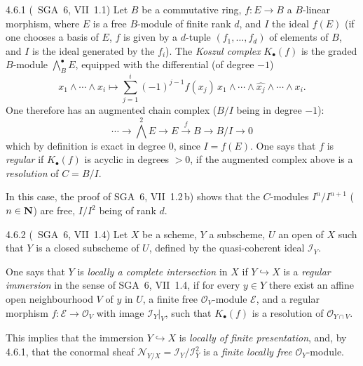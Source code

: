 \begin{definition}{4.6.1}
\label{III.4.6.1}
(\cf\ SGA~6, VII~1.1)
Let \(B\) be a commutative ring, \(f\colon E\to B\) a \(B\)-linear morphism, where \(E\) is a free \(B\)-module of finite rank \(d\), and \(I\) the ideal \(f(E)\) (if one chooses a basis of \(E\), \(f\) is given by a \(d\)-tuple \((f_{1},\ldots,f_{d})\) of elements of \(B\), and \(I\) is the ideal generated by the \(f_{i}\)). The \emph{Koszul complex} \(K_{\bullet}(f)\) is the graded \(B\)-module \(\bigwedge^{\bullet}_{B}E\), equipped with the differential (of degree \(-1\))
\[
x_{1}\wedge\cdots\wedge x_{i}
\longmapsto
\sum_{j=1}^{i}(-1)^{j-1}f(x_{j})\,x_{1}\wedge\cdots\wedge\widehat{x_{j}}\wedge\cdots\wedge x_{i}.
\]
One therefore has an augmented chain complex (\(B/I\) being in degree \(-1\)):
\[
\cdots\longrightarrow\bigwedge^{2}E\longrightarrow E\xrightarrow{f}B\longrightarrow B/I\longrightarrow 0
\]
which by definition is exact in degree \(0\), since \(I=f(E)\). One says that \(f\) is \emph{regular} if \(K_{\bullet}(f)\) is acyclic in degrees \(>0\), \ie if the augmented complex above is a \emph{resolution} of \(C=B/I\).

In this case, the proof of SGA~6, VII~1.2\,b) shows that the \(C\)-modules \(I^{n}/I^{n+1}\) (\(n\in\mathbf{N}\)) are free, \(I/I^{2}\) being of rank \(d\).
\end{definition}

\begin{definition}{4.6.2}
\label{III.4.6.2}
(\cf\ SGA~6, VII~1.4)
Let \(X\) be a scheme, \(Y\) a subscheme, \(U\) an open of \(X\) such that \(Y\) is a closed subscheme of \(U\), defined by the quasi-coherent ideal \(\mathcal{I}_{Y}\).

One says that \(Y\) is \emph{locally a complete intersection} in \(X\) if \(Y\hookrightarrow X\) is a \emph{regular immersion} in the sense of SGA~6, VII~1.4, \ie if for every \(y\in Y\) there exist an affine open neighbourhood \(V\) of \(y\) in \(U\), a finite free \(\mathcal{O}_{V}\)-module \(\mathcal{E}\), and a regular morphism \(f\colon\mathcal{E}\to\mathcal{O}_{V}\) with image \(\mathcal{I}_{Y}|_{V}\), \ie such that \(K_{\bullet}(f)\) is a resolution of \(\mathcal{O}_{Y\cap V}\).

This implies that the immersion \(Y\hookrightarrow X\) is \emph{locally of finite presentation}, and, by 4.6.1, that the conormal sheaf \(\mathcal{N}_{Y/X}=\mathcal{I}_{Y}/\mathcal{I}_{Y}^{2}\) is a \emph{finite locally free} \(\mathcal{O}_{Y}\)-module.
\end{definition}

